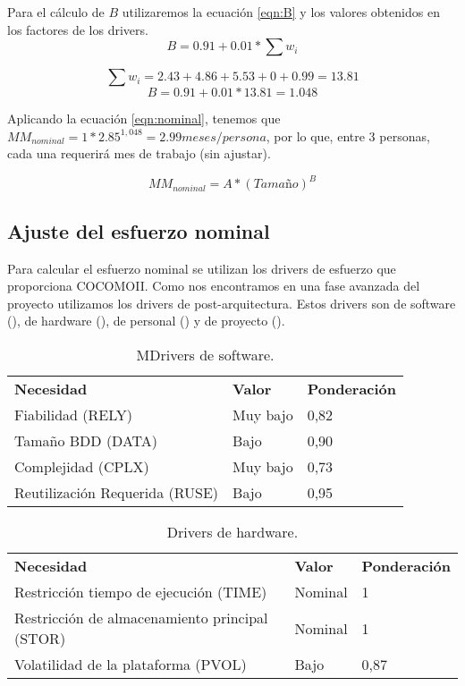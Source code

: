 \par Para el cálculo de $B$ utilizaremos la ecuación \ref{eqn:B} y los valores obtenidos en los factores de los drivers.
\begin{equation} \label{eqn:B}B = 0.91 + 0.01 *\sum w_{i}\end{equation}

$$\sum w_{i}=2.43+4.86+5.53+0+0.99=13.81$$
$$B = 0.91 + 0.01*13.81=1.048$$

\par Aplicando la ecuación \ref{eqn:nominal}, tenemos que $MM_{nominal}=1*2.85^{1,048}=2.99meses/persona$, por lo que, entre 3 personas, cada una requerirá  mes de trabajo (sin ajustar).

\begin{equation} \label{eqn:nominal}MM_{nominal}=A*(Tamaño)^B\end{equation}



\subsection{Ajuste del esfuerzo nominal}
Para calcular el esfuerzo nominal se utilizan los drivers de esfuerzo que proporciona COCOMOII. Como nos encontramos en una fase avanzada del proyecto utilizamos los drivers de  post-arquitectura. Estos drivers son de software (\label{tab:software}), de hardware (\label{tab:hardware}), de personal (\label{tab:personal}) y de proyecto (\label{tab:proyecto}).

\begin{table}[h]
\begin{center}
\begin{tabular}{ l l l }
\textbf{Necesidad} & \textbf{Valor} & \textbf{Ponderación} \\
Fiabilidad (RELY) &
Muy bajo &
0,82 \\
Tamaño BDD (DATA) &
Bajo &
0,90 \\
Complejidad (CPLX) &
Muy bajo &
0,73 \\
Reutilización Requerida (RUSE) &
Bajo &
0,95 \\
\end{tabular}
\caption{MDrivers de software.}
\label{tab:software}
\end{center}
\end{table}

\begin{table}[h]
\begin{center}
\begin{tabular}{ l l l }
\textbf{Necesidad} & \textbf{Valor} & \textbf{Ponderación} \\
Restricción tiempo de ejecución (TIME) &
Nominal &
1 \\
Restricción de almacenamiento principal (STOR) &
Nominal &
1 \\
Volatilidad de la plataforma (PVOL) &
Bajo &
0,87 \\
\end{tabular}
\caption{Drivers de hardware.}
\label{tab:hardware}
\end{center}
\end{table}

